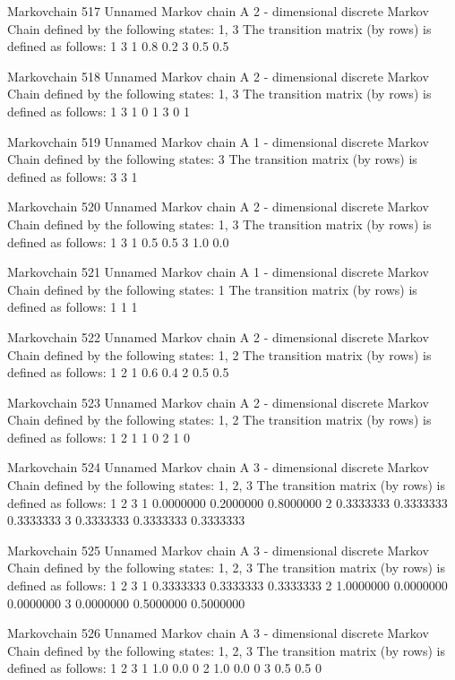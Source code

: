 \documentclass[
  nojss]{jss}
\begin{document}
\begin{CodeChunk}
\begin{CodeOutput}
Markovchain  517 
Unnamed Markov chain 
 A  2 - dimensional discrete Markov Chain defined by the following states: 
 1, 3 
 The transition matrix  (by rows)  is defined as follows: 
    1   3
1 0.8 0.2
3 0.5 0.5

Markovchain  518 
Unnamed Markov chain 
 A  2 - dimensional discrete Markov Chain defined by the following states: 
 1, 3 
 The transition matrix  (by rows)  is defined as follows: 
  1 3
1 0 1
3 0 1

Markovchain  519 
Unnamed Markov chain 
 A  1 - dimensional discrete Markov Chain defined by the following states: 
 3 
 The transition matrix  (by rows)  is defined as follows: 
  3
3 1

Markovchain  520 
Unnamed Markov chain 
 A  2 - dimensional discrete Markov Chain defined by the following states: 
 1, 3 
 The transition matrix  (by rows)  is defined as follows: 
    1   3
1 0.5 0.5
3 1.0 0.0

Markovchain  521 
Unnamed Markov chain 
 A  1 - dimensional discrete Markov Chain defined by the following states: 
 1 
 The transition matrix  (by rows)  is defined as follows: 
  1
1 1

Markovchain  522 
Unnamed Markov chain 
 A  2 - dimensional discrete Markov Chain defined by the following states: 
 1, 2 
 The transition matrix  (by rows)  is defined as follows: 
    1   2
1 0.6 0.4
2 0.5 0.5

Markovchain  523 
Unnamed Markov chain 
 A  2 - dimensional discrete Markov Chain defined by the following states: 
 1, 2 
 The transition matrix  (by rows)  is defined as follows: 
  1 2
1 1 0
2 1 0

Markovchain  524 
Unnamed Markov chain 
 A  3 - dimensional discrete Markov Chain defined by the following states: 
 1, 2, 3 
 The transition matrix  (by rows)  is defined as follows: 
          1         2         3
1 0.0000000 0.2000000 0.8000000
2 0.3333333 0.3333333 0.3333333
3 0.3333333 0.3333333 0.3333333

Markovchain  525 
Unnamed Markov chain 
 A  3 - dimensional discrete Markov Chain defined by the following states: 
 1, 2, 3 
 The transition matrix  (by rows)  is defined as follows: 
          1         2         3
1 0.3333333 0.3333333 0.3333333
2 1.0000000 0.0000000 0.0000000
3 0.0000000 0.5000000 0.5000000

Markovchain  526 
Unnamed Markov chain 
 A  3 - dimensional discrete Markov Chain defined by the following states: 
 1, 2, 3 
 The transition matrix  (by rows)  is defined as follows: 
    1   2 3
1 1.0 0.0 0
2 1.0 0.0 0
3 0.5 0.5 0


\end{CodeOutput}
\end{CodeChunk}
\end{document}
